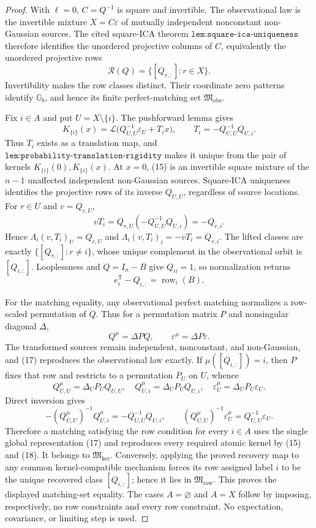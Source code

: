 \documentclass{article}
\begin{document}
\begin{proof}
With \(\ell=0\), \(C=Q^{-1}\) is square and invertible. The observational law is the invertible mixture \(X=C\varepsilon\) of mutually independent nonconstant non-Gaussian sources. The cited square-ICA theorem \(\texttt{lem:square-ica-uniqueness}\) therefore identifies the unordered projective columns of \(C\), equivalently the unordered projective rows
\[
\mathscr R(Q)=\{[Q_{r,:}]:r\in X\}.
\]
Invertibility makes the row classes distinct. Their coordinate zero patterns identify \(\mathbb G_b\), and hence its finite perfect-matching set \(\mathfrak M_{\mathrm{obs}}\).

Fix \(i\in A\) and put \(U=X\setminus\{i\}\). The pushforward lemma gives
\[
K_{\{i\}}(x)=\mathcal L\bigl(Q_{U,U}^{-1}\varepsilon_U+T_i x\bigr),
\qquad T_i=-Q_{U,U}^{-1}Q_{U,i}. \tag{15}
\]
Thus \(T_i\) exists as a translation map, and \(\texttt{lem:probability-translation-rigidity}\) makes it unique from the pair of kernels \(K_{\{i\}}(0),K_{\{i\}}(x)\). At \(x=0\), (15) is an invertible square mixture of the \(n-1\) unaffected independent non-Gaussian sources. Square-ICA uniqueness identifies the projective rows of its inverse \(Q_{U,U}\), regardless of source locations. For \(r\in U\) and \(v=Q_{r,U}\),
\[
vT_i=Q_{r,U}(-Q_{U,U}^{-1}Q_{U,i})=-Q_{r,i}.
\]
Hence \(\Lambda_i(v,T_i)_U=Q_{r,U}\) and \(\Lambda_i(v,T_i)_i=-vT_i=Q_{r,i}\). The lifted classes are exactly \(\{[Q_{r,:}]:r\ne i\}\), whose unique complement in the observational orbit is \([Q_{i,:}]\). Looplessness and \(Q=I_n-B\) give \(Q_{ii}=1\), so normalization returns
\[
e_i^{\mathsf T}-Q_{i,:}=\operatorname{row}_i(B). \tag{16}
\]

For the matching equality, any observational perfect matching normalizes a row-scaled permutation of \(Q\). Thus for a permutation matrix \(P\) and nonsingular diagonal \(\Delta\),
\[
Q^\mu=\Delta P Q,
\qquad \varepsilon^\mu=\Delta P\varepsilon. \tag{17}
\]
The transformed sources remain independent, nonconstant, and non-Gaussian, and (17) reproduces the observational law exactly. If \(\mu([Q_{i,:}])=i\), then \(P\) fixes that row and restricts to a permutation \(P_U\) on \(U\), whence
\[
Q^\mu_{U,U}=\Delta_UP_UQ_{U,U},\quad
Q^\mu_{U,i}=\Delta_UP_UQ_{U,i},\quad
\varepsilon^\mu_U=\Delta_UP_U\varepsilon_U.
\]
Direct inversion gives
\[
-(Q^\mu_{U,U})^{-1}Q^\mu_{U,i}=-Q_{U,U}^{-1}Q_{U,i},
\qquad
(Q^\mu_{U,U})^{-1}\varepsilon^\mu_U=Q_{U,U}^{-1}\varepsilon_U. \tag{18}
\]
Therefore a matching satisfying the row condition for every \(i\in A\) uses the single global representation (17) and reproduces every required atomic kernel by (15) and (18). It belongs to \(\mathfrak M_{\mathrm{ker}}\). Conversely, applying the proved recovery map to any common kernel-compatible mechanism forces its row assigned label \(i\) to be the unique recovered class \([Q_{i,:}]\); hence it lies in \(\mathfrak M_{\mathrm{row}}\). This proves the displayed matching-set equality. The cases \(A=\varnothing\) and \(A=X\) follow by imposing, respectively, no row constraints and every row constraint. No expectation, covariance, or limiting step is used.
\end{proof}
\end{document}
